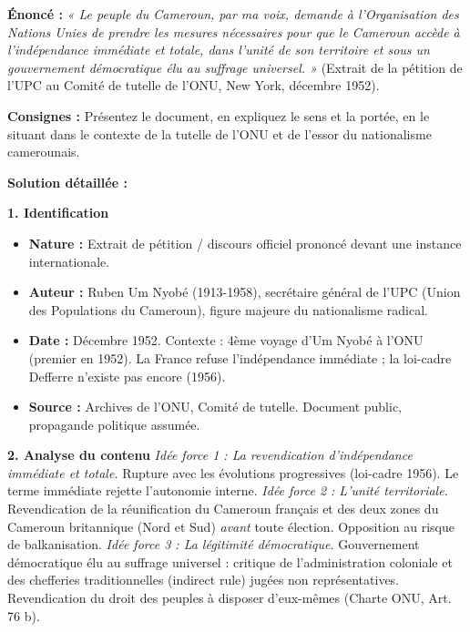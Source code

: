 \documentclass[11pt]{article}
\newcommand{\cle}[1]{{\popxbold\color{popdark}#1}}
\begin{document}
\begin{exoresolu}
\textbf{Énoncé :} \emph{« Le peuple du Cameroun, par ma voix, demande à l'Organisation des Nations Unies de prendre les mesures nécessaires pour que le Cameroun accède à l'indépendance immédiate et totale, dans l'unité de son territoire et sous un gouvernement démocratique élu au suffrage universel. »} (Extrait de la pétition de l'UPC au Comité de tutelle de l'ONU, New York, décembre 1952).\par
\textbf{Consignes :} Présentez le document, en expliquez le sens et la portée, en le situant dans le contexte de la tutelle de l'ONU et de l'essor du nationalisme camerounais.

\tcblower
\textbf{Solution détaillée :}

\textbf{1. Identification}
\begin{itemize}
    \item \textbf{Nature :} Extrait de pétition / discours officiel prononcé devant une instance internationale.
    \item \textbf{Auteur :} \cle{Ruben Um Nyobé} (1913-1958), secrétaire général de l'\cle{UPC} (Union des Populations du Cameroun), figure majeure du nationalisme radical.
    \item \textbf{Date :} Décembre 1952. Contexte : 4ème voyage d'Um Nyobé à l'ONU (premier en 1952). La France refuse l'indépendance immédiate ; la loi-cadre Defferre n'existe pas encore (1956).
    \item \textbf{Source :} Archives de l'ONU, Comité de tutelle. Document public, propagande politique assumée.
\end{itemize}

\textbf{2. Analyse du contenu}
\emph{Idée force 1 : La revendication d'indépendance immédiate et totale.} Rupture avec les évolutions progressives (loi-cadre 1956). Le terme \guillemotleft immédiate \guillemotright rejette l'autonomie interne.
\emph{Idée force 2 : L'unité territoriale.} Revendication de la réunification du Cameroun français et des deux zones du Cameroun britannique (Nord et Sud) \emph{avant} toute élection. Opposition au risque de balkanisation.
\emph{Idée force 3 : La légitimité démocratique.} \guillemotleft Gouvernement démocratique élu au suffrage universel \guillemotright : critique de l'administration coloniale et des chefferies traditionnelles (indirect rule) jugées non représentatives. Revendication du droit des peuples à disposer d'eux-mêmes (Charte ONU, Art. 76 b).


\end{exoresolu}
\end{document}
